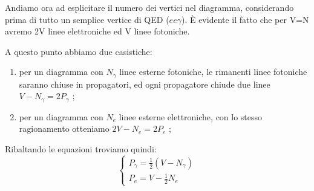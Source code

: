 \documentclass[../main.tex]{subfiles}
\begin{document}
Andiamo ora ad esplicitare il numero dei vertici nel diagramma, considerando prima di tutto un semplice vertice di QED ($ee\gamma$). È evidente il fatto che per V=N avremo 2V linee elettroniche ed V linee fotoniche.

A questo punto abbiamo due casistiche:
\begin{enumerate}
    \item per un diagramma con $N_\gamma$ linee esterne fotoniche, le rimanenti linee fotoniche saranno chiuse in propagatori, ed ogni propagatore chiude due linee $V - N_\gamma = 2P_\gamma$ ;
    \item per un diagramma con $N_e$ linee esterne elettroniche, con lo stesso ragionamento otteniamo $2V - N_e = 2P_e$ ;
\end{enumerate}

Ribaltando le equazioni troviamo quindi:
\begin{equation}
    \begin{cases}
        P_\gamma = \frac{1}{2}(V - N_\gamma) \\
        P_e = V - \frac{1}{2}N_e
    \end{cases}
    \label{eq:propagators}
\end{equation}
\end{document}
